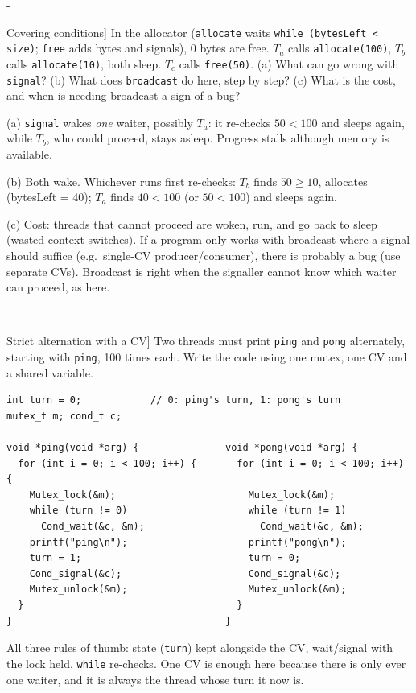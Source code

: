 \documentclass[11pt,a4paper]{article}
\makeatletter
\newcommand{\keepspace}[1]{\par\penalty-100\begingroup
  \setlength{\dimen@}{#1}\dimen@ii\pagegoal\advance\dimen@ii-\pagetotal
  \ifdim\dimen@>\dimen@ii\ifdim\dimen@ii>\z@\vfil\fi\break\fi\endgroup}
\newcounter{qn}[section]
\newcommand{\lecno}{}
\newenvironment{Qn}[2]{\refstepcounter{qn}\keepspace{8\baselineskip}%
  \begin{quizbox}[Q\lecno.\theqn\ \ [#1] #2]}{\end{quizbox}}
\newenvironment{Sol}{\begin{solbox}[Solution]}{\end{solbox}\vspace{0.4em}}
\makeatother
\begin{document}
\begin{Qn}{Concept}{Covering conditions}
In the allocator (\texttt{allocate} waits \texttt{while (bytesLeft <
size)}; \texttt{free} adds bytes and signals), 0 bytes are free.
\(T_a\) calls \texttt{allocate(100)}, \(T_b\) calls \texttt{allocate(10)},
both sleep. \(T_c\) calls \texttt{free(50)}. (a) What can go wrong with
\texttt{signal}? (b) What does \texttt{broadcast} do here, step by step?
(c) What is the cost, and when is needing broadcast a sign of a bug?
\end{Qn}
\begin{Sol}
(a) \texttt{signal} wakes \emph{one} waiter, possibly \(T_a\): it re-checks
\(50 < 100\) and sleeps again, while \(T_b\), who could proceed, stays
asleep. Progress stalls although memory is available.

(b) Both wake. Whichever runs first re-checks: \(T_b\) finds
\(50 \ge 10\), allocates (bytesLeft = 40); \(T_a\) finds \(40 < 100\) (or
\(50<100\)) and sleeps again.

(c) Cost: threads that cannot proceed are woken, run, and go back to sleep
(wasted context switches). If a program only works with broadcast where a
signal should suffice (e.g.\ single-CV producer/consumer), there is
probably a bug (use separate CVs). Broadcast is right when the signaller
cannot know which waiter can proceed, as here.
\end{Sol}

\begin{Qn}{Design}{Strict alternation with a CV}
Two threads must print \texttt{ping} and \texttt{pong} alternately,
starting with \texttt{ping}, 100 times each. Write the code using one mutex,
one CV and a shared variable.
\end{Qn}
\begin{Sol}
\begin{lstlisting}[numbers=none]
int turn = 0;            // 0: ping's turn, 1: pong's turn
mutex_t m; cond_t c;

void *ping(void *arg) {               void *pong(void *arg) {
  for (int i = 0; i < 100; i++) {       for (int i = 0; i < 100; i++) {
    Mutex_lock(&m);                       Mutex_lock(&m);
    while (turn != 0)                     while (turn != 1)
      Cond_wait(&c, &m);                    Cond_wait(&c, &m);
    printf("ping\n");                     printf("pong\n");
    turn = 1;                             turn = 0;
    Cond_signal(&c);                      Cond_signal(&c);
    Mutex_unlock(&m);                     Mutex_unlock(&m);
  }                                     }
}                                     }
\end{lstlisting}
All three rules of thumb: state (\texttt{turn}) kept alongside the CV,
wait/signal with the lock held, \texttt{while} re-checks. One CV is enough
here because there is only ever one waiter, and it is always the thread
whose turn it now is.
\end{Sol}
\end{document}
